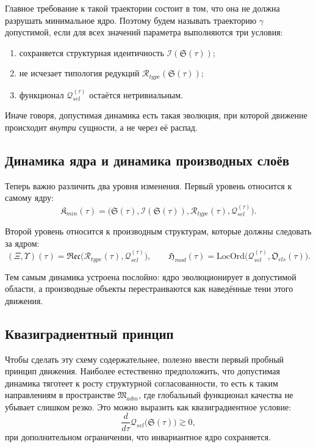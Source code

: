 \documentclass[12pt,a4paper]{article}
\begin{document}
Главное требование к такой траектории состоит в том, что она не должна разрушать минимальное ядро. Поэтому будем называть траекторию \(\gamma\) допустимой, если для всех значений параметра выполняются три условия:
\begin{enumerate}
    \item сохраняется структурная идентичность \(\mathcal{I}(\mathfrak{S}(\tau))\);
    \item не исчезает типология редукций \(\mathcal{R}_{type}(\mathfrak{S}(\tau))\);
    \item функционал \(\mathcal{Q}_{sel}^{(\tau)}\) остаётся нетривиальным.
\end{enumerate}

Иначе говоря, допустимая динамика есть такая эволюция, при которой движение происходит \textit{внутри} сущности, а не через её распад.

\subsection{Динамика ядра и динамика производных слоёв}

Теперь важно различить два уровня изменения. Первый уровень относится к самому ядру:
\begin{equation}
\mathfrak{K}_{min}(\tau)=\bigl(\mathfrak{S}(\tau),\mathcal{I}(\mathfrak{S}(\tau)),\mathcal{R}_{type}(\tau),\mathcal{Q}_{sel}^{(\tau)}\bigr).
\end{equation}

Второй уровень относится к производным структурам, которые должны следовать за ядром:
\begin{equation}
(\Xi,\Upsilon)(\tau)=\mathfrak{Rec}\bigl(\mathcal{R}_{type}(\tau),\mathcal{Q}_{sel}^{(\tau)}\bigr),
\qquad
\mathfrak{H}_{mod}(\tau)=\mathrm{LocOrd}\bigl(\mathcal{Q}_{sel}^{(\tau)},\mathfrak{O}_{cls}(\tau)\bigr).
\end{equation}

Тем самым динамика устроена послойно: ядро эволюционирует в допустимой области, а производные объекты перестраиваются как наведённые тени этого движения.

\subsection{Квазиградиентный принцип}

Чтобы сделать эту схему содержательнее, полезно ввести первый пробный принцип движения. Наиболее естественно предположить, что допустимая динамика тяготеет к росту структурной согласованности, то есть к таким направлениям в пространстве \(\mathfrak{M}_{adm}\), где глобальный функционал качества не убывает слишком резко. Это можно выразить как квазиградиентное условие:
\begin{equation}
\frac{d}{d\tau}\mathcal{Q}_{sel}\bigl(\mathfrak{S}(\tau)\bigr) \gtrsim 0,
\end{equation}
при дополнительном ограничении, что инвариантное ядро сохраняется.
\end{document}
